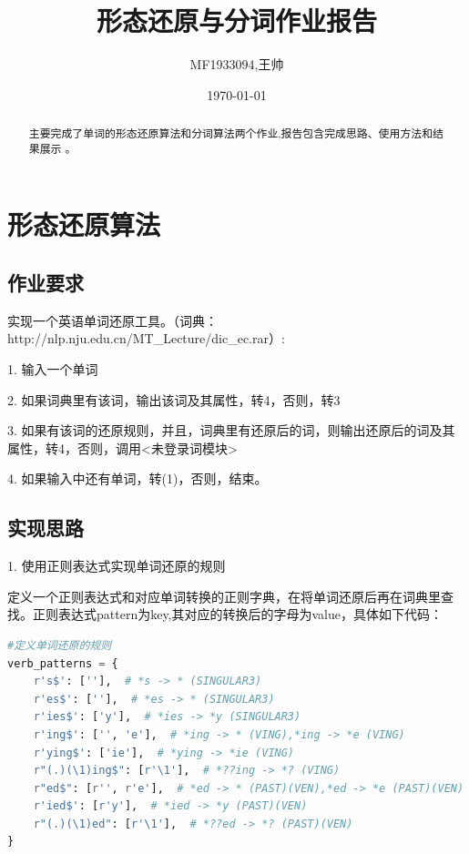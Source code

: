 \documentclass[UTF8]{ctexart}  %
\begin{document}
\title{形态还原与分词作业报告}  %
\author{MF1933094,王帅}  %
\date{\today}    %
\maketitle     %

\begin{abstract}         %
	主要完成了单词的形态还原算法和分词算法两个作业,报告包含完成思路、使用方法和结果展示 。%
\end{abstract}

\tableofcontents  %
\section{形态还原算法}  %
\subsection{作业要求}
实现一个英语单词还原工具。（词典：http://nlp.nju.edu.cn/MT\_Lecture/dic\_ec.rar）:

1. 输入一个单词

2. 如果词典里有该词，输出该词及其属性，转4，否则，转3

3. 如果有该词的还原规则，并且，词典里有还原后的词，则输出还原后的词及其属性，转4，否则，调用<未登录词模块>

4. 如果输入中还有单词，转(1)，否则，结束。

\subsection{实现思路}
1. 使用正则表达式实现单词还原的规则

定义一个正则表达式和对应单词转换的正则字典，在将单词还原后再在词典里查找。正则表达式pattern为key,其对应的转换后的字母为value，具体如下代码：
\begin{lstlisting}[language=python]
#定义单词还原的规则
verb_patterns = {
	r's$': [''],  # *s -> * (SINGULAR3)
	r'es$': [''],  # *es -> * (SINGULAR3)
	r'ies$': ['y'],  # *ies -> *y (SINGULAR3)
	r'ing$': ['', 'e'],  # *ing -> * (VING),*ing -> *e (VING)
	r'ying$': ['ie'],  # *ying -> *ie (VING)
	r"(.)(\1)ing$": [r'\1'],  # *??ing -> *? (VING)
	r"ed$": [r'', r'e'],  # *ed -> * (PAST)(VEN),*ed -> *e (PAST)(VEN)
	r'ied$': [r'y'],  # *ied -> *y (PAST)(VEN)
	r"(.)(\1)ed": [r'\1'],  # *??ed -> *? (PAST)(VEN)
}
\end{lstlisting}
\end{document}
